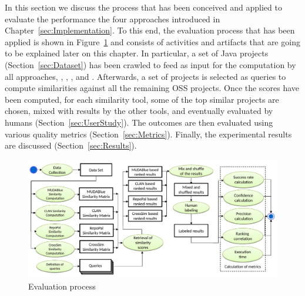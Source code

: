




In this section we discuss the process that has been conceived and applied to evaluate the performance the four approaches introduced in Chapter~\ref{sec:Implementation}. To this end, the evaluation process that has been applied is shown in Figure~\ref{fig:EvaluationProcess} and consists of activities and artifacts that are going to be explained later on this chapter. In particular, a set of Java projects (Section~\ref{sec:Dataset}) has been crawled to feed as input for the computation by all approaches, \ie \MUDABlue, \CLAN, \RepoPal, and \CrossSim. Afterwards, a set of projects is selected as queries to compute similarities against all the remaining OSS projects. Once the scores have been computed, for each similarity tool, some of the top similar projects are chosen, mixed with results by the other tools, and eventually evaluated by humans (Section~\ref{sec:UserStudy}). The outcomes are then evaluated using various quality metrics (Section~\ref{sec:Metrics}). Finally, the experimental results are discussed (Section~\ref{sec:Results}).%


\begin{figure}[h!]
	\centering
	\includegraphics[width=0.99\linewidth]{images/EvaluationProcess}
	\caption{Evaluation process}
	\label{fig:EvaluationProcess}
\end{figure}









